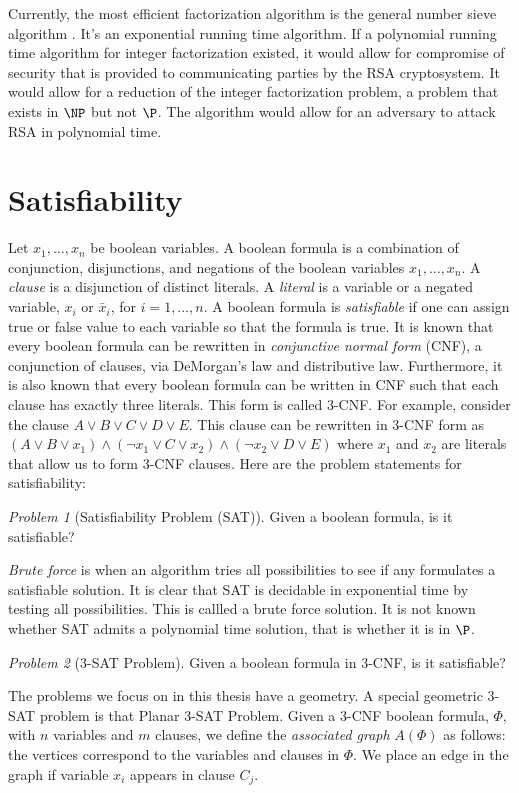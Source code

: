 \documentclass[10pt]{CSUNthesis}
\theoremstyle{plain}%
\theoremstyle{definition}
\theoremstyle{remark}
\newtheorem{prob}{Problem}
\begin{document}
Currently, the most efficient factorization algorithm is the general number sieve algorithm \cite{lenstra1993number}.
It's an exponential running time algorithm.
If a polynomial running time algorithm for integer factorization existed, it would allow for compromise of security that is provided to communicating parties by the RSA cryptosystem.
It would allow for a reduction of the integer factorization problem, a problem that exists in $\NP$ but not $\P$.
The algorithm would allow for an adversary to attack RSA \cite{menezes1996handbook} in polynomial time.



\section{Satisfiability}
Let $x_1, \dots, x_n$ be boolean variables.  A boolean formula is a combination of conjunction, 
disjunctions, and negations of the boolean variables $x_1,  \dots, x_n$.   
A \textit{clause} is a disjunction of distinct literals.  
A \textit{literal} is a variable or a negated variable, $x_i$ or $\bar{x}_i$, for $i = 1,\dots,n$. 
A boolean formula is \textit{satisfiable} if one can assign true or false value to each variable so that the formula is true. 
It is known that every boolean formula can be rewritten in \textit{conjunctive normal form} (CNF), a conjunction of clauses, via DeMorgan's law and distributive law.   
Furthermore, it is also known that every boolean formula can be written in CNF such that each clause has exactly three literals. 
This form is called 3-CNF.  
For example, consider the clause $A \lor B \lor C \lor D \lor E$. 
This clause can be rewritten in 3-CNF form as $(A \lor B \lor x_1) \land (\lnot x_1 \lor C \lor x_2) \land (\lnot x_2 \lor D \lor E)$ where $x_1$ and $x_2$ are literals that allow us to form 3-CNF clauses.
Here are the problem statements for satisfiability:
\begin{prob}[Satisfiability Problem (SAT)]\label{prob:Satisfiability-1}%
Given a boolean formula, is it satisfiable? \cite{skiena2009algorithm}
\end{prob} 
\textit{Brute force} is when an algorithm tries all possibilities to see if any formulates a satisfiable solution.
It is clear that SAT is decidable in exponential time by testing all possibilities.
This is callled a brute force solution.
It is not known whether SAT admits a polynomial time solution, that is whether it is in $\P$. 
\begin{prob}[3-SAT Problem]
Given a boolean formula in 3-CNF, is it satisfiable?
\end{prob}
The problems we focus on in this thesis have a geometry.  
A special geometric 3-SAT problem is that Planar 3-SAT Problem.   
Given a 3-CNF boolean formula, $\Phi$, with $n$ variables and $m$ clauses, 
we define the \textit{associated graph} $A(\Phi)$ as follows: the vertices correspond to the variables and clauses in $\Phi$.   
We place an edge in the graph if variable $x_i$ appears in clause $C_j$.
\end{document}
